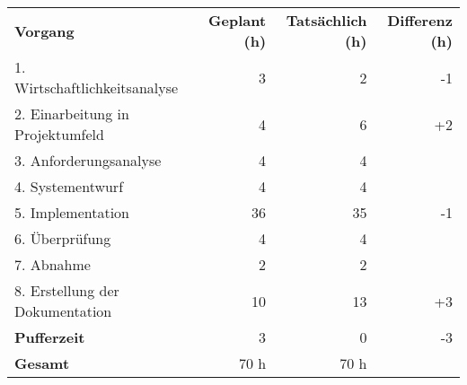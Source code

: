 \begin{tabular}{lrrr}
\rowcolor{KVGruen}\textbf{Vorgang} & \textbf{Geplant (h)} & \textbf{Tatsächlich (h)} & \textbf{Differenz (h)} \\
1. Wirtschaftlichkeitsanalyse & 3 & 2 & -1 \\
\rowcolor{KVGrau}2. Einarbeitung in Projektumfeld & 4   & 6  & +2 \\
3. Anforderungsanalyse & 4 & 4 & \\
\rowcolor{KVGrau}4. Systementwurf & 4   & 4   &  \\
5. Implementation & 36 & 35 & -1 \\
\rowcolor{KVGrau}6. Überprüfung & 4   & 4  &  \\
7. Abnahme & 2 & 2 &  \\
\rowcolor{KVGrau}8. Erstellung der Dokumentation & 10  & 13  & +3 \\
\textbf{Pufferzeit} & 3   & 0  & -3 \\
\hline
\hline
\rowcolor{KVGrau}\textbf{Gesamt} & 70 h  & 70 h  &  \\
\end{tabular}